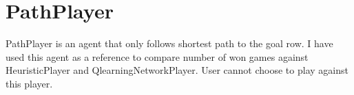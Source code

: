 % 
% 


\section{PathPlayer}
PathPlayer is an agent that only follows shortest path to the goal row. I have
used this agent as a reference to compare number of won games against
HeuristicPlayer and QlearningNetworkPlayer. User cannot choose to play against
this player.

